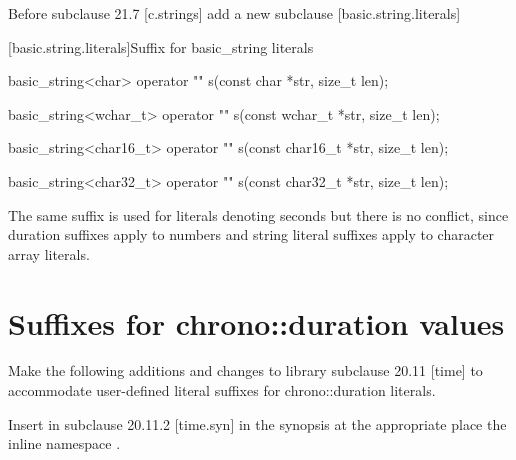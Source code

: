 \documentclass[ebook,11pt,article]{memoir}
\begin{document}
Before subclause 21.7 [c.strings] add a new subclause [basic.string.literals]

[basic.string.literals]{Suffix for basic_string literals}
\begin{itemdecl}
basic_string<char> operator "" s(const char *str, size_t len);
\end{itemdecl}

\begin{itemdescr}
\pnum
\returns
{}
\end{itemdescr}

\begin{itemdecl}
basic_string<wchar_t> operator "" s(const wchar_t *str, size_t len);
\end{itemdecl}
\begin{itemdescr}
\pnum
\returns
{}
\end{itemdescr}

\begin{itemdecl}
basic_string<char16_t> operator "" s(const char16_t *str, size_t len);
\end{itemdecl}
\begin{itemdescr}
\pnum
\returns
{}
\end{itemdescr}

\begin{itemdecl}
basic_string<char32_t> operator "" s(const char32_t *str, size_t len);
\end{itemdecl}
\begin{itemdescr}
\pnum
\returns
{}
\end{itemdescr}
\enternote
The same suffix  is used for  literals denoting seconds but there is no conflict, since duration suffixes apply to numbers and string literal suffixes apply to character array literals.
\exitnote




\section{Suffixes for chrono::duration values}
Make the following additions and changes to library subclause 20.11 [time] to accommodate user-defined literal suffixes for chrono::duration literals.

Insert in subclause 20.11.2 [time.syn] in the synopsis at the appropriate place the inline namespace .
\renewcommand{\unspec}{\UNSP{unspecified}}%
\end{document}
